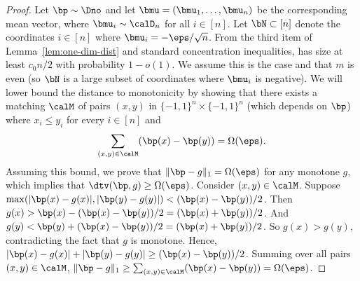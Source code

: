 \begin{proof}
Let $\bp \sim \Dno$ and let $\bmu = (\bmu_1,\dots, \bmu_n)$ be the corresponding mean vector, where $\bmu_i\sim \calD_n$ for all $i \in [n]$. 
Let $\bN \subset [n]$ denote the coordinates $i \in [n]$ where $\bmu_i = -\eps / \sqrt{n}$. From the third item of Lemma~\ref{lem:one-dim-dist} and standard concentration inequalities,  has size at least $c_0 n / 2$ with probability $1-o(1)$. We assume this is the case and that $m$ is even (so $\bN$ is a large subset of coordinates where $\bmu_i$ is negative). We will lower bound 
the distance to monotonicity by showing that there exists a matching $\calM$ of pairs $(x, y)$ in $\{-1,1\}^n \times \{-1,1\}^n$ (which depends on $\bp$) where $x_i \leq y_i$ for every $i \in [n]$ and
\begin{align*}
\sum_{(x,y) \in \calM} ( \bp(x) - \bp(y) ) = \Omega(\eps).
\end{align*}
Assuming this bound, we prove that $\|\bp - g\|_1 = \Omega(\eps)$ for any monotone $g$, which
implies that $\dtv(\bp, g)\ge \Omega(\eps)$. Consider $(x,y) \in \calM$.
Suppose $\max(|\bp(x) - g(x)|, |\bp(y) - g(y)|) < (\bp(x) - \bp(y))/2$.
Then $g(x) > \bp(x) - (\bp(x) - \bp(y))/2 = (\bp(x) + \bp(y))/2$.
And $g(y) < \bp(y) + (\bp(x) - \bp(y))/2 = (\bp(x) + \bp(y))/2$. So $g(x) > g(y)$,
contradicting the fact that $g$ is monotone. Hence, $|\bp(x) - g(x)| + |\bp(y) - g(y)| \geq (\bp(x) - \bp(y))/2$.
Summing over all pairs $(x,y) \in \calM$, $\|\bp - g\|_1 \geq \sum_{(x,y) \in \calM} ( \bp(x) - \bp(y) ) = \Omega(\eps)$.


\end{proof}

